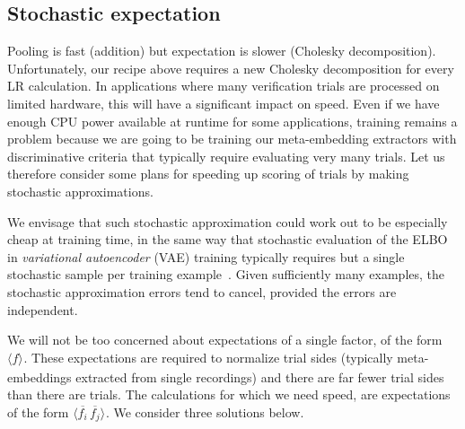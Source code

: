 \documentclass[a4paper,oneside,12pt,english]{report}
\def\expv#1#2{\bigl\langle#1\bigr\rangle_{#2}}
\def\normal#1{\overline{#1}}
\begin{document}
\subsection{Stochastic expectation}
\def\tvec{\mathbf{t}}
Pooling is fast (addition) but expectation is slower (Cholesky decomposition). Unfortunately, our recipe above requires a new Cholesky decomposition for every LR calculation. In applications where many verification trials are processed on limited hardware, this will have a significant impact on speed. Even if we have enough CPU power available at runtime for some applications, training remains a problem because we are going to be training our meta-embedding extractors with discriminative criteria that typically require evaluating very many trials. Let us therefore consider some plans for speeding up scoring of trials by making stochastic approximations.

We envisage that such stochastic approximation could work out to be especially cheap at training time, in the same way that stochastic evaluation of the ELBO in \emph{variational autoencoder} (VAE) training typically requires but a single stochastic sample per training example~\cite{VAE}. Given sufficiently many examples, the stochastic approximation errors tend to cancel, provided the errors are independent. 

We will not be too concerned about expectations of a single factor, of the form $\expv{f}{}$. These expectations are required to normalize trial sides (typically meta-embeddings extracted from single recordings) and there are far fewer trial sides than there are trials. The calculations for which we need speed, are expectations of the form $\expv{\normal{f_i}\,\normal{f_j}}{}$. We consider three solutions below.\\
\end{document}
